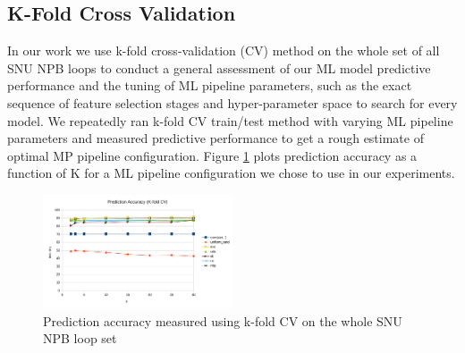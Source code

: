 \documentclass[sigconf,10pt,review,anonymous]{acmart}
\begin{document}

\subsection{K-Fold Cross Validation}
\label{evaluation_kfold}
\quad In our work we use k-fold cross-validation (CV) method on the whole set of all SNU NPB loops to conduct a general assessment of our ML model predictive performance and the tuning of ML pipeline parameters, such as the exact sequence of feature selection stages and hyper-parameter space to search for every model. We repeatedly ran k-fold CV train/test method with varying ML pipeline parameters and measured predictive performance to get a rough estimate of optimal MP pipeline configuration. Figure \ref{fig:accuracy} plots prediction accuracy as a function of K for a ML pipeline configuration we chose to use in our experiments.

\begin{figure}[h]
\includegraphics[width=0.5\textwidth]{figures/prediction_accuracy_kfold}
\caption{Prediction accuracy measured using k-fold CV on the whole SNU NPB loop set}
\label{fig:accuracy}
\end{figure}
\end{document}
